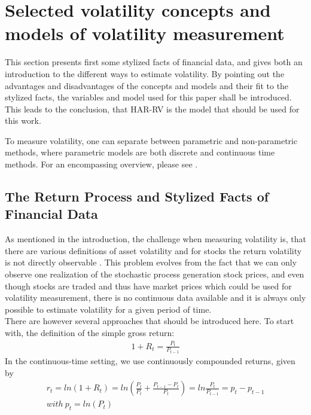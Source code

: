 
\section{Selected volatility concepts and models of volatility measurement}
This section presents first some stylized facts of financial data, and gives both an introduction to the different ways to estimate volatility. By pointing out the advantages and disadvantages of the concepts and models and their fit to the stylized facts, the variables and model used for this paper shall be introduced. This leads to the conclusion, that HAR-RV is the model that should be used for this work.

To measure volatility, one can separate between parametric and non-parametric methods, where parametric models are both discrete and continuous time methods. For an encompassing overview, please see \citeauthor{andersen2001}. 


\subsection{The Return Process and Stylized Facts of Financial Data}
As mentioned in the introduction, the challenge when measuring volatility is, that there are various definitions of asset volatility and for stocks the return volatility is not directly observable \parencite{tsay2005}. This problem evolves from the fact that we can only observe one realization of the stochastic process generation stock prices, and even though stocks are traded and thus have market prices which could be used for volatility measurement, there is no continuous data available and it is always only possible to estimate volatility for a given period of time.\\
There are however several approaches that should be introduced here. To start with, the definition of the simple gross return:
\begin{align}\label{eq:return}
1+ R_{t} = \frac{P_{t}}{P_{t-1}} 
\end{align}
In the continuous-time setting, we use continuously compounded returns, given by
\begin{align*}
r_{t} = ln(1 + R_{t}) = ln (\frac{P_{t}}{P_{t}} + \frac{P_{t-1} - P_{t}}{P_{t}}) = 
ln \frac{P_{t}}{P_{t-1}} = p_{t} - p_{t-1}\\
with\  p_{t} = ln(P_{t})
\end{align*}



